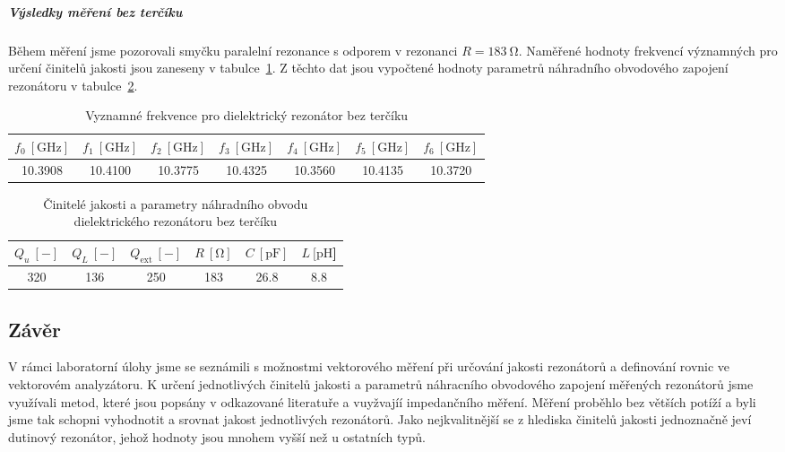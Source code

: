 \documentclass[11pt,a4paper]{article}
\newcommand{\Ohm}{\mathrm{\Omega}}
\newcommand{\GHz}{\mathrm{GHz}}
\begin{document}
\subparagraph*{Výsledky měření bez terčíku} Během měření jsme pozorovali smyčku paralelní rezonance s odporem v rezonanci $R = 183\ \Ohm$. Naměřené hodnoty frekvencí významných pro určení činitelů jakosti jsou zaneseny v tabulce~\ref{table:dielektricky-rezonator-bez-terciku-frekvence}. Z těchto dat jsou vypočtené hodnoty parametrů náhradního obvodového zapojení rezonátoru v tabulce~\ref{table:dielektricky-rezonator-bez-terciku-hodnoty}.
\begin{table}[!ht]
\centering
\begin{tabular}{|c|c|c|c|c|c|c|}
    \hline
    $f_0\ [\GHz]$ & $f_1\ [\GHz]$ & $f_2\ [\GHz]$ & $f_3\ [\GHz]$ & $f_4\ [\GHz]$ & $f_5\ [\GHz]$ & $f_6\ [\GHz]$\\
    \hline\hline
    10.3908 & 10.4100 & 10.3775 & 10.4325 & 10.3560 & 10.4135 & 10.3720\\
    \hline
\end{tabular}
\caption{\label{table:dielektricky-rezonator-bez-terciku-frekvence}Vyznamné frekvence pro dielektrický rezonátor bez terčíku}
\end{table}
\begin{table}[!ht]
\centering
\begin{tabular}{|c|c|c|c|c|c|}
    \hline
    $Q_u\ [-]$ & $Q_L\ [-]$ & $Q_{\mathrm{ext}}\ [-]$ & $R\ [\mathrm{\Omega}]$ & $C\ [\mathrm{pF}]$ & $L\ [\mathrm{pH}$]\\
    \hline\hline
    320 & 136 & 250 & 183 & 26.8 & 8.8\\
    \hline
\end{tabular}
\caption{\label{table:dielektricky-rezonator-bez-terciku-hodnoty}Činitelé jakosti a parametry náhradního obvodu dielektrického rezonátoru bez terčíku}
\end{table}

\subsection*{Závěr}
V rámci laboratorní úlohy jsme se seznámili s možnostmi vektorového měření při určování jakosti rezonátorů a definování rovnic ve vektorovém analyzátoru. K určení jednotlivých činitelů jakosti a parametrů náhracního obvodového zapojení měřených rezonátorů jsme využívali metod, které jsou popsány v odkazované literatuře a vuyžvajíí impedančního měření. Měření proběhlo bez větších potíží a byli jsme tak schopni vyhodnotit a srovnat jakost jednotlivých rezonátorů. Jako nejkvalitnější se z hlediska činitelů jakosti jednoznačně jeví dutinový rezonátor, jehož hodnoty jsou mnohem vyšší než u ostatních typů.
\end{document}

